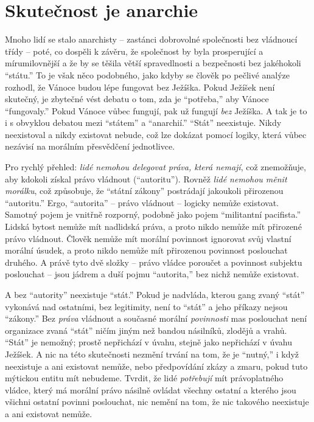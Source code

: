 \documentclass{book}
\begin{document}
\section{Skutečnost je anarchie}

Mnoho lidí se stalo anarchisty -- zastánci dobrovolné společnosti bez vládnoucí třídy -- poté, co dospěli k závěru, že společnost by byla prosperující a mírumilovnější a že by se těšila větší spravedlnosti a bezpečnosti bez jakéhokoli \enquote{státu.} To je však něco podobného, jako kdyby se člověk po pečlivé analýze rozhodl, že Vánoce budou lépe fungovat bez Ježíška. Pokud Ježíšek není skutečný, je zbytečné vést debatu o tom, zda je \enquote{potřeba,} aby Vánoce \enquote{fungovaly.} Pokud Vánoce vůbec fungují, pak už fungují \emph{bez} Ježíška. A tak je to i s obvyklou debatou mezi \enquote{státem} a \enquote{anarchií.} \enquote{Stát} neexistuje. Nikdy neexistoval a nikdy existovat nebude, což lze dokázat pomocí logiky, která vůbec nezávisí na morálním přesvědčení jednotlivce.

Pro rychlý přehled: \emph{lidé nemohou delegovat práva, která nemají}, což znemožňuje, aby kdokoli získal právo vládnout (\enquote{autoritu}). Rovněž \emph{lidé nemohou měnit morálku}, což způsobuje, že \enquote{státní zákony} postrádají jakoukoli přirozenou \enquote{autoritu.} Ergo, \enquote{autorita} -- právo vládnout -- logicky nemůže existovat. Samotný pojem je vnitřně rozporný, podobně jako pojem \enquote{militantní pacifista.} Lidská bytost nemůže mít nadlidská práva, a proto nikdo nemůže mít přirozené právo vládnout. Člověk nemůže mít morální povinnost ignorovat svůj vlastní morální úsudek, a proto nikdo nemůže mít přirozenou povinnost poslouchat druhého. A právě tyto dvě složky -- právo vládce poroučet a povinnost subjektu poslouchat -- jsou jádrem a duší pojmu \enquote{autorita,} bez nichž nemůže existovat.

A bez \enquote{autority} neexistuje \enquote{stát.} Pokud je nadvláda, kterou gang zvaný \enquote{stát} vykonává nad ostatními, bez legitimity, není to \enquote{stát} a jeho příkazy nejsou \enquote{zákony.} Bez \emph{práva} vládnout a současné morální \emph{povinnosti} mas poslouchat není organizace zvaná \enquote{stát} ničím jiným než bandou násilníků, zlodějů a vrahů. \enquote{Stát} je nemožný; prostě nepřichází v úvahu, stejně jako nepřichází v úvahu Ježíšek. A nic na této skutečnosti nezmění trvání na tom, že je \enquote{nutný,} i když neexistuje a ani existovat nemůže, nebo předpovídání zkázy a zmaru, pokud tuto mýtickou entitu mít nebudeme. Tvrdit, že lidé \emph{potřebují} mít právoplatného vládce, který má morální právo násilně ovládat všechny ostatní a kterého jsou všichni ostatní povinni poslouchat, nic nemění na tom, že nic takového neexistuje a ani existovat nemůže.
\end{document}
